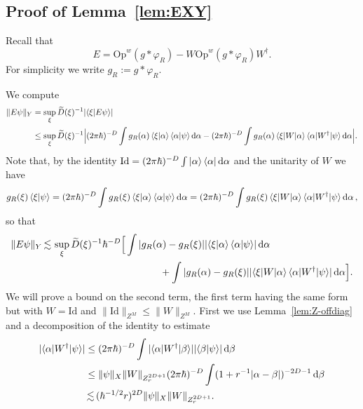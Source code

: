 \documentclass[11pt]{amsart}
\def\Op{\mathrm{Op}}
\def\Id{\mathrm{Id}}
\newcommand{\diff}{\mathop{}\!\mathrm{d}}
\def\lsim{{\,\lesssim\,}}
\def\bra#1{\mathinner{\langle{#1}|}}
\def\ket#1{\mathinner{|{#1}\rangle}}
\def\braket#1{\mathinner{\langle{#1}\rangle}}
\def\Braket#1{\!\mathinner{\langle{#1}\rangle}\!}
\numberwithin{equation}{section}
\begin{document}
\subsection{Proof of Lemma~\ref{lem:EXY}}
\label{sec:proofE}
Recall that
\[
E = \Op^w(g\ast \varphi_{R}) - W \Op^w(g\ast \varphi_{R}) W^\dagger.
\]
For simplicity we write $g_R := g\ast \varphi_{R}$.

We compute
\begin{align*}
\|E\psi\|_Y
&= \sup_\xi \widetilde{D}(\xi)^{-1} |\Braket{\xi|E\psi}| \\
&\leq \sup_\xi \widetilde{D}(\xi)^{-1}
\Big|(2\pi \hbar)^{-D}\int g_R(\alpha)\braket{\xi|\alpha}\braket{\alpha|\psi}\diff \alpha
- (2\pi\hbar)^{-D} \int g_R(\alpha) \braket{\xi|W|\alpha}\braket{\alpha|W^\dagger|\psi}\diff\alpha\Big|.
\end{align*}
Note that, by the identity $\Id = (2\pi\hbar)^{-D} \int \ket{\alpha}\bra{\alpha}\diff\alpha$ and the unitarity of $W$ we have
\[
g_R(\xi) \braket{\xi|\psi} = (2\pi\hbar)^{-D} \int g_R(\xi) \braket{\xi|\alpha}\braket{\alpha|\psi}\diff\alpha
= (2\pi\hbar)^{-D} \int g_R(\xi) \braket{\xi|W|\alpha}\braket{\alpha|W^\dagger|\psi}\diff \alpha\,,
\]
so that
\begin{align*}
\|E\psi\|_Y &\lsim
\sup_\xi
\widetilde{D}(\xi)^{-1} \hbar^{-D}
\Big[\int |g_R(\alpha)-g_R(\xi)| |\!\braket{\xi|\alpha}\braket{\alpha|\psi}\!|\diff \alpha
\nonumber \\
& \qquad \qquad \qquad \qquad \qquad \qquad + \int|g_R(\alpha)-g_R(\xi)| |\!\braket{\xi|W|\alpha}\braket{\alpha|W^\dagger|\psi}\!| \diff \alpha\Big].
\end{align*}
We will prove a bound on the second term, the first term having the same form but with $W = \Id$
and $\|\Id\|_{Z^M} \leq \|W\|_{Z^M}$.
First we use Lemma~\ref{lem:Z-offdiag} and a decomposition of the identity to estimate
\begin{align*}
|\Braket{\alpha |W^\dagger|\psi}|
&\leq (2\pi\hbar)^{-D} \int |\Braket{\alpha|W^\dagger|\beta}| |\Braket{\beta|\psi}| \diff \beta \\
&\leq \|\psi\|_X \|W\|_{Z^{2D+1}_r}
(2\pi\hbar)^{-D} \int (1 + r^{-1}|\alpha-\beta|)^{-2D-1} \diff \beta \\
&\lsim (\hbar^{-1/2}r)^{2D} \|\psi\|_X \|W\|_{Z^{2D+1}_r}.
\end{align*}
\end{document}

